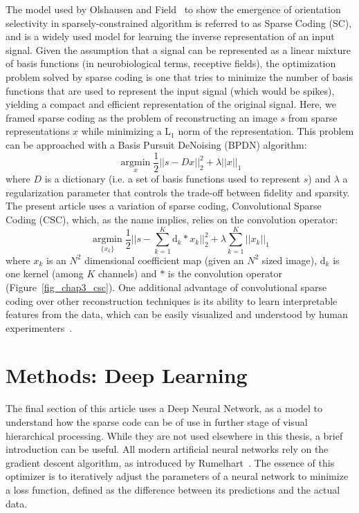 The model used by Olshausen and Field~\cite{olshausen1996emergence} to show the emergence of orientation selectivity in sparsely-constrained algorithm is referred to as Sparse Coding (SC), and is a widely used model for learning the inverse representation of an input signal. Given the assumption that a signal can be represented as a linear mixture of basis functions (in neurobiological terms, receptive fields), the optimization problem solved by sparse coding is one that tries to minimize the number of basis functions that are used to represent the input signal (which would be spikes), yielding a compact and efficient representation of the original signal. Here, we framed sparse coding as the problem of reconstructing an image $s$ from sparse representations $x$ while minimizing a $\text{L}_1$ norm of the representation. This problem can be approached with a Basis Pursuit DeNoising (BPDN) algorithm:
\begin{equation} 
    \underset{x}{\operatorname{arg min}} \frac{1}{2} || s - D x ||^2_2 + \lambda ||x ||_1
\end{equation} 
where $D$ is a dictionary (i.e. a set of basis functions used to represent $s$) and $\lambda$ a regularization parameter that controls the trade-off between fidelity and sparsity. The present article uses a variation of sparse coding, Convolutional Sparse Coding (CSC), which, as the name implies, relies on the convolution operator: 
\begin{equation} \label{eq:csc}
    \underset{\{x_k\}}{\operatorname{arg min}} \frac{1}{2}
    || s - \sum_{k=1}^K \text{d}_k \ast x_k ||^2_2 + 
    \lambda \sum_{k=1}^K ||x_k||_1
\end{equation}
where $x_k$ is an $N^2$ dimensional coefficient map (given an $N^2$ sized image), $\text{d}_k$ is one kernel (among $K$ channels) and $\ast$ is the convolution operator (Figure~\ref{fig_chap3_csc}). One additional advantage of convolutional sparse coding over other reconstruction techniques is its ability to learn interpretable features from the data, which can be easily visualized and understood by human experimenters~\cite{boutin2020sparse}. 

\section{Methods: Deep Learning}
The final section of this article uses a Deep Neural Network, as a model to understand how the sparse code can be of use in further stage of visual hierarchical processing. While they are not used elsewhere in this thesis, a brief introduction can be useful. All modern artificial neural networks rely on the gradient descent algorithm, as introduced by Rumelhart~\cite{rumelhart1986learning}. The essence of this optimizer is to iteratively adjust the parameters of a neural network to minimize a loss function, defined as the difference between its predictions and the actual data.

